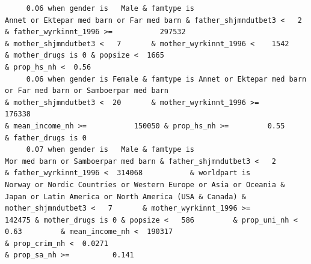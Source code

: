 \documentclass[
  letterpaper,
  DIV=11,
  numbers=noendperiod]{scrreprt}
\begin{document}
\begin{verbatim}
     0.06 when gender is   Male & famtype is                        Annet or Ektepar med barn or Far med barn & father_shjmndutbet3 <   2       & father_wyrkinnt_1996 >=           297532                                                                                                                                                    & mother_shjmndutbet3 <   7       & mother_wyrkinnt_1996 <    1542           & mother_drugs is 0 & popsize <  1665                                                                            & prop_hs_nh <  0.56                                                                                                                                                                                                                                                                                                                       
     0.06 when gender is Female & famtype is Annet or Ektepar med barn or Far med barn or Samboerpar med barn                                                                                                                                                                                                                                 & mother_shjmndutbet3 <  20       & mother_wyrkinnt_1996 >=           176338                                                                             & mean_income_nh >=           150050 & prop_hs_nh >=         0.55                                                                                                                                                                                                 & father_drugs is 0                                                                                           
     0.07 when gender is   Male & famtype is                              Mor med barn or Samboerpar med barn & father_shjmndutbet3 <   2       & father_wyrkinnt_1996 <  314068           & worldpart is            Norway or Nordic Countries or Western Europe or Asia or Oceania & Japan or Latin America or North America (USA & Canada) & mother_shjmndutbet3 <   7       & mother_wyrkinnt_1996 >=           142475 & mother_drugs is 0 & popsize <   586         & prop_uni_nh <  0.63         & mean_income_nh <  190317                                        & prop_crim_nh <  0.0271                                                                                                                  & prop_sa_nh >=          0.141                                                                                                                                      

\end{verbatim}
\end{document}
